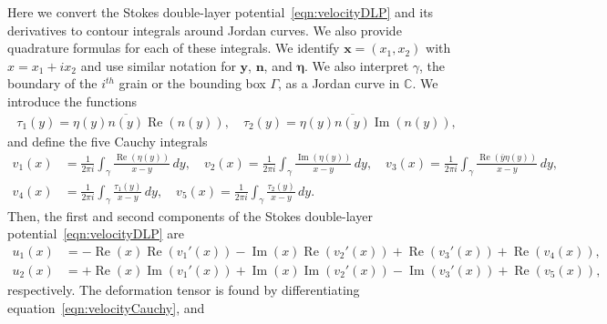 \documentclass[3p]{elsarticle}
\newcommand{\edit}[1]{{\color{red} #1}}
\newcommand{\CC}{{\mathbb{C}}}
\newcommand{\eeta}{{\boldsymbol\eta}}
\newcommand{\nn}{{\mathbf{n}}}
\renewcommand{\Re}{{\operatorname{Re}}}
\renewcommand{\Im}{{\operatorname{Im}}}
\newcommand{\xx}{{\mathbf{x}}}
\newcommand{\yy}{{\mathbf{y}}}
\newcommand{\pderiv}[2]{\frac{\partial #1}{\partial #2}}
\begin{document}
\begin{appendices}
\edit{Here we convert the Stokes double-layer
  potential~\eqref{eqn:velocityDLP} and its derivatives to contour
  integrals around Jordan curves. We also provide quadrature formulas
  for each of these integrals.}
We identify $\xx = (x_1,x_2)$ with $x = x_1 + ix_2$ and use similar notation for $\yy$, $\nn$, and $\eeta$. We also interpret $\gamma$, the boundary of the $i^{th}$ grain or the bounding box $\Gamma$, as a Jordan curve in $\CC$. We introduce the functions
\begin{align}
  \tau_1(y) = \eta(y) \overline{n(y)} \Re(n(y)), \quad 
  \tau_2(y) = \eta(y) \overline{n(y)} \Im(n(y)),
\end{align}
and define the five Cauchy integrals
\begin{align}
  v_1(x) &= \frac{1}{2\pi i} \int_{\gamma} \frac{\Re(\eta(y))}{x-y} \,dy, 
  \quad
  v_2(x) = \frac{1}{2\pi i} \int_{\gamma} \frac{\Im(\eta(y))}{x-y} \, dy, 
  \quad
  v_3(x) = \frac{1}{2\pi i} \int_{\gamma}
  \frac{\Re(\overline{y}\eta(y))}{x-y} \, dy, \\
  v_4(x) &= \frac{1}{2\pi i} \int_{\gamma} \frac{\tau_1(y)}{x-y} \, dy,
  \quad
  v_5(x) = \frac{1}{2\pi i} \int_{\gamma} \frac{\tau_2(y)}{x-y} \, dy.
\end{align}
Then, the first and second components of the Stokes double-layer
  potential~\eqref{eqn:velocityDLP} are
\begin{subequations}
  \begin{align}
    u_1(x) &= -\Re(x)\Re(v_1'(x)) - \Im(x)\Re(v_2'(x)) + 
             \Re(v_3'(x)) + \Re(v_4(x)), \\
    u_2(x) &= +\Re(x)\Im(v_1'(x)) + \Im(x)\Im(v_2'(x)) - 
             \Im(v_3'(x)) + \Re(v_5(x)),
  \end{align}
  \label{eqn:velocityCauchy}
\end{subequations}
respectively. \edit{The deformation tensor is found by differentiating
  equation~\eqref{eqn:velocityCauchy}, and}

\end{appendices}
\end{document}
